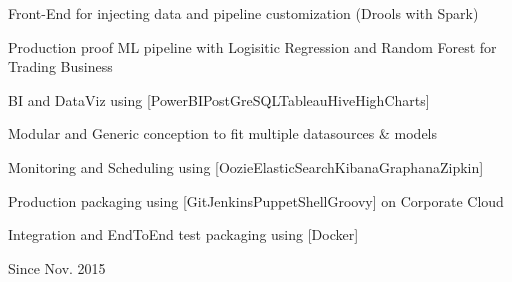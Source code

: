 \begin{cventries}
{\begin{cvsubentries}
{\begin{cvitems}
	\item {Front-End for injecting data and pipeline customization (Drools with Spark) }
	\item {Production proof ML pipeline with Logisitic Regression and Random Forest for Trading Business}
	\item {BI and DataViz using [PowerBI{\enskip\cdotp\enskip}PostGreSQL{\enskip\cdotp\enskip}Tableau{\enskip\cdotp\enskip}Hive{\enskip\cdotp\enskip}HighCharts]}
	\item {Modular and Generic conception to fit multiple datasources \& models}
	\item {Monitoring and Scheduling using [\scriptsize Oozie{\enskip\cdotp\enskip}ElasticSearch{\enskip\cdotp\enskip}Kibana{\enskip\cdotp\enskip}Graphana{\enskip\cdotp\enskip}Zipkin]}
	\item {Production packaging using [Git{\enskip\cdotp\enskip}Jenkins{\enskip\cdotp\enskip}Puppet{\enskip\cdotp\enskip}Shell{\enskip\cdotp\enskip}Groovy] on Corporate Cloud}
	\item {Integration and EndToEnd test packaging using [Docker]}
\end{cvitems}
}{Since Nov. 2015}{}
\end{cvsubentries}
}



\end{cventries}
